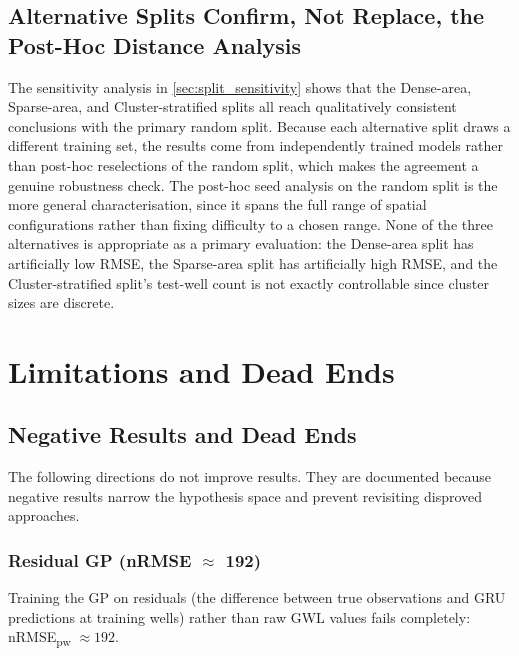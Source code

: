 \subsection{Alternative Splits Confirm, Not Replace, the Post-Hoc Distance Analysis}
\label{sec:alt_split_lessons}

The sensitivity analysis in \cref{sec:split_sensitivity} shows that the Dense-area, Sparse-area, and Cluster-stratified splits all reach qualitatively consistent conclusions with the primary random split. Because each alternative split draws a different training set, the results come from independently trained models rather than post-hoc reselections of the random split, which makes the agreement a genuine robustness check. The post-hoc seed analysis on the random split is the more general characterisation, since it spans the full range of spatial configurations rather than fixing difficulty to a chosen range. None of the three alternatives is appropriate as a primary evaluation: the Dense-area split has artificially low RMSE, the Sparse-area split has artificially high RMSE, and the Cluster-stratified split's test-well count is not exactly controllable since cluster sizes are discrete.

\section{Limitations and Dead Ends}
\label{sec:dead_ends_section}

\subsection{Negative Results and Dead Ends}
\label{sec:dead_ends}

The following directions do not improve results. They are documented because negative results narrow the hypothesis space and prevent revisiting disproved approaches.

\subsubsection{Residual GP (\texorpdfstring{nRMSE $\approx$ 192}{nRMSE approx 192})}

Training the GP on residuals (the difference between true observations and GRU predictions at training wells) rather than raw GWL values fails completely: nRMSE\textsubscript{pw} $\approx 192$.

